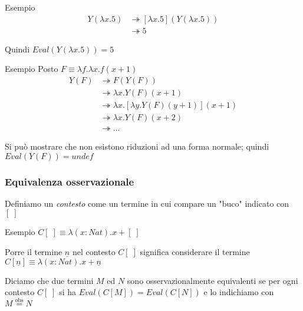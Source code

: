 \documentclass{beamer}
\newcommand{\eqobs}{\stackrel{\text{obs}}{=}}
\begin{document}
\begin{frame}

	\begin{block}{Esempio}
		\begin{align*}
			Y(\lambda x .5) & \twoheadrightarrow [\lambda x .5](Y(\lambda x .5)) \\
											& \twoheadrightarrow 5 
		\end{align*}
	
		Quindi $Eval( Y(\lambda x . 5) ) = 5$
	
	\end{block}

	\begin{block}{Esempio}
			Posto $F \equiv \lambda f . \lambda x . f(x+1)$
			\begin{align*}
				Y(F) & \twoheadrightarrow F(Y(F)) \\
						 & \twoheadrightarrow \lambda x . Y(F)(x+1) \\
						 & \twoheadrightarrow \lambda x . [\lambda y . Y(F)(y+1)](x+1) \\
						 & \twoheadrightarrow \lambda x . Y(F)(x+2) \\
						 & \twoheadrightarrow \dots
			\end{align*}
			
			Si può mostrare che non esistono riduzioni ad una forma normale; quindi $Eval(Y(F))=undef$

	\end{block}

\end{frame}




\begin{frame}
	
	\frametitle{Equivalenza osservazionale}
	
	Definiamo un \emph{contesto} come un termine in cui compare un "buco" indicato con $[\;]$
	
	\begin{block}{Esempio}
		$C[\;] \equiv \lambda (x:Nat).x+[\;]$
		
		Porre il termine $\underline{n}$ nel contesto $C[\;]$ significa considerare il termine
		$C[\underline{n}] \equiv \lambda (x:Nat).x+\underline{n}$
	\end{block}
	
	Diciamo che due termini $M$ ed $N$ sono osservazionalmente equivalenti se per ogni contesto $C[\;]$ si ha $Eval(C[M])=Eval(C[N])$
	e lo indichiamo con $M\eqobs N$
	
\end{frame}
\end{document}
